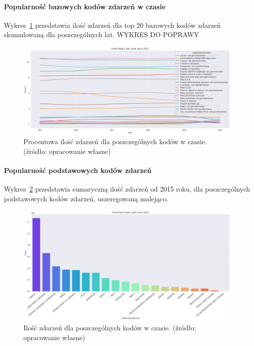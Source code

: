 \documentclass[11pt]{report}
\begin{document}
    \paragraph{Popularność bazowych kodów zdarzeń w czasie}
    Wykres~\ref{fig:GLOBALEBCperc} przedstawia ilość zdarzeń dla top 20 bazowych kodów zdarzeń skumulowaną dla poszczególnych lat.
    WYKRES DO POPRAWY
    \begin{figure}[ht!]
        \centering
        \includegraphics[width=1 \textwidth]{fig/GLOBAL/EBCperc.png}
        \caption{Procentowa ilość zdarzeń dla poszczególnych kodów w czasie. (źródło: opracowanie własne)}
        \label{fig:GLOBALEBCperc}
    \end{figure}

    \paragraph{Popularność podstawowych kodów zdarzeń}
    Wykres~\ref{fig:GLOBALERC} przedstawia sumaryczną ilość zdarzeń od 2015 roku, dla poszczególnych podstawowych kodów zdarzeń, uszeregowaną malejąco.
    \begin{figure}[ht!]
        \centering
        \includegraphics[width=1 \textwidth]{fig/GLOBAL/ERC.png}
        \caption{Ilość zdarzeń dla poszczególnych kodów w czasie. (źródło: opracowanie własne)}
        \label{fig:GLOBALERC}
    \end{figure}
\end{document}
